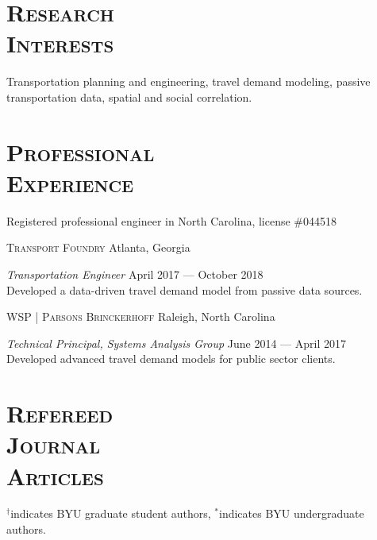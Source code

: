 \documentclass[margin,line]{res}
\newif\ifdetail
\newcommand{\secfont}{\scshape }
\newcommand{\acc}{\scshape }
\begin{document}
\begin{resume}
\section{\secfont Research\\ Interests}
Transportation planning and engineering, travel demand modeling,
passive transportation data, spatial and social correlation.

\noindent\makebox[\linewidth]{\rule{\linewidth}{0.4pt}}

\section{\secfont Professional \\ Experience}

Registered professional engineer in North Carolina, license \#044518

{\acc Transport Foundry} Atlanta, Georgia

\vspace{-.3cm}
\textit{Transportation Engineer} \hfill {April 2017 --- October 2018}\\
Developed a data-driven travel demand model from passive data sources.

{\acc WSP | Parsons Brinckerhoff} Raleigh, North Carolina

\vspace{-.3cm}
\textit{Technical Principal, Systems Analysis Group} \hfill {June 2014 --- April 2017}\\
Developed advanced travel demand models for public sector clients.

\noindent\makebox[\linewidth]{\rule{\linewidth}{0.4pt}}







\section{\secfont Refereed \\ Journal\\ Articles}
$^\dagger$indicates BYU graduate student authors, $^*$indicates BYU undergraduate authors.
\ifdetail 
Paper 1 came from my undergraduate work, papers 2 through 6 were from my doctoral research, and
papers 7 onward represent work completed during my time on the faculty at BYU. Number of citations
are from Google Scholar as of October 2024. Work published since my third year review appears in blue.\fi
\vspace{.3cm}


\end{resume}
\end{document}
